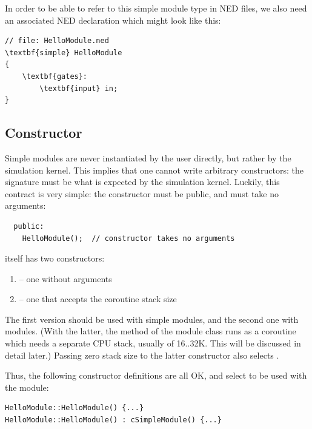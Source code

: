 In order to be able to refer to this simple module type
in NED files, we also need an associated NED declaration which might
look like this:

\begin{Verbatim}[commandchars=\\\{\}]
// file: HelloModule.ned
\textbf{simple} HelloModule
{
    \textbf{gates}:
        \textbf{input} in;
}
\end{Verbatim}


\subsection{Constructor}
\label{sec:simple-modules:module-ctor}

Simple modules are never instantiated by the user directly, but rather by
the simulation kernel. This implies that one cannot write arbitrary
constructors: the signature must be what is expected by the simulation kernel.
Luckily, this contract is very simple: the constructor must be public, and must take
no arguments:

\begin{verbatim}
  public:
    HelloModule();  // constructor takes no arguments
\end{verbatim}

 itself has two constructors:
\begin{enumerate}
  \item{ -- one without arguments}
  \item{ -- one that accepts the coroutine
        stack size}
\end{enumerate}

The first version should be used with  simple modules,
and the second one with  modules.
(With the latter, the  method of the module class
runs as a coroutine which needs a separate CPU stack,
usually of 16..32K. This will be discussed in detail later.)
Passing zero stack size to the latter constructor also selects .

Thus, the following constructor definitions are all OK, and select
 to be used with the module:

\begin{verbatim}
HelloModule::HelloModule() {...}
HelloModule::HelloModule() : cSimpleModule() {...}
\end{verbatim}

